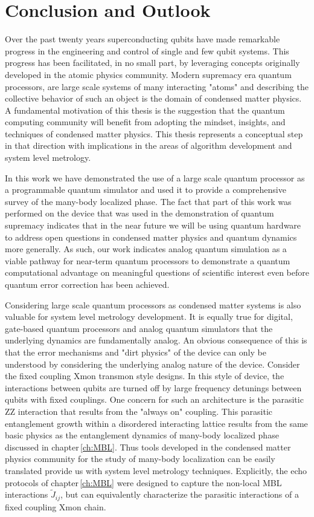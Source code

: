 \chapter[Conclusion and Outlook]{Conclusion and Outlook}

Over the past twenty years superconducting qubits have made remarkable progress in the engineering and control of single and few qubit systems.
This progress has been facilitated, in no small part, by leveraging concepts originally developed in the atomic physics community.
Modern supremacy era quantum processors, are large scale systems of many interacting "atoms" and describing the collective behavior of such an object is the domain of condensed matter physics.
A fundamental motivation of this thesis is the suggestion that the quantum computing community will benefit from adopting the mindset, insights, and techniques of condensed matter physics.
This thesis represents a conceptual step in that direction with implications in the areas of algorithm development and system level metrology.

In this work we have demonstrated the use of a large scale quantum processor as a programmable quantum simulator and used it to provide a comprehensive survey of the many-body localized phase.
The fact that part of this work was performed on the device that was used in the demonstration of quantum supremacy\cite{Arute2019}
indicates that in the near future we will be using quantum hardware to address open questions in condensed matter physics and quantum dynamics more generally.
As such, our work indicates analog quantum simulation as a viable pathway for near-term quantum processors to demonstrate a quantum computational advantage on meaningful questions of scientific interest
even before quantum error correction has been achieved.

Considering large scale quantum processors as condensed matter systems is also valuable for system level metrology development.
It is equally true for digital, gate-based quantum processors and analog quantum simulators that the underlying dynamics are fundamentally analog.
An obvious consequence of this is that the error mechanisms and "dirt physics" of the device can only be understood by considering the underlying analog nature of the device.
Consider the fixed coupling Xmon transmon style designs. In this style of device, the interactions between qubits are turned off by large frequency detunings between qubits with fixed couplings.
One concern for such an architecture is the parasitic ZZ interaction that results from the "always on" coupling.
This parasitic entanglement growth within a disordered interacting lattice results from the same basic physics as the entanglement dynamics of many-body localized phase discussed in chapter\,\ref{ch:MBL}.
Thus tools developed in the condensed matter physics community for the study of many-body localization can be easily translated provide us with system level metrology techniques.
Explicitly, the echo protocols of chapter\,\ref{ch:MBL} were designed to capture the non-local MBL interactions $\widetilde{J}_{ij}$,
but can equivalently characterize the parasitic interactions of a fixed coupling Xmon chain.

